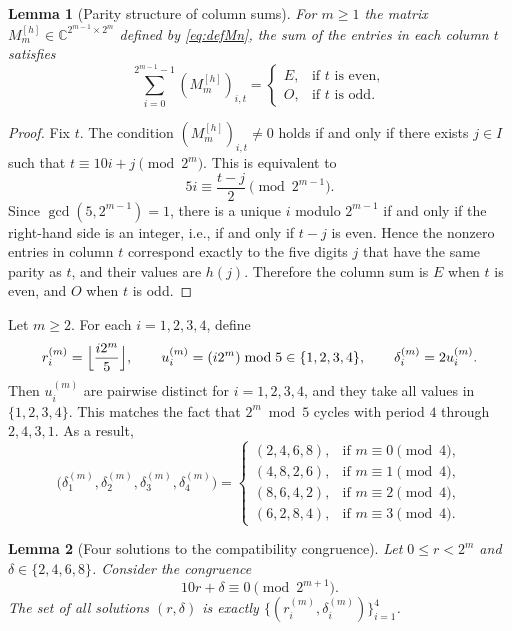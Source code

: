 \documentclass[11pt,a4paper]{article}
\newtheorem{lemma}{Lemma}
\theoremstyle{plain}
\begin{document}
\begin{lemma}[Parity structure of column sums]\label{lem:colsum}
For $m\ge 1$ the matrix $M_m^{[h]}\in\mathbb{C}^{2^{m-1}\times 2^{m}}$ defined by \eqref{eq:defMn}, the sum of the entries in each column $t$ satisfies
\[
\sum_{i=0}^{2^{m-1}-1} (M_m^{[h]})_{i,t} =
\begin{cases}
E, & \text{if } t \text{ is even},\\[1ex]
O, & \text{if } t \text{ is odd}.
\end{cases}
\]
\end{lemma}

\begin{proof}
Fix $t$.
The condition $(M_m^{[h]})_{i,t}\neq 0$ holds if and only if there exists $j \in I$ such that $t \equiv 10i+j \pmod{2^m}$.
This is equivalent to
\[
5i \equiv \frac{t-j}{2} \pmod{2^{m-1}}.
\]
Since $\gcd(5,2^{m-1})=1$, there is a unique $i$ modulo $2^{m-1}$ if and only if the right-hand side is an integer, i.e., if and only if $t-j$ is even.
Hence the nonzero entries in column $t$ correspond exactly to the five digits $j$ that have the same parity as $t$, and their values are $h(j)$.
Therefore the column sum is $E$ when $t$ is even, and $O$ when $t$ is odd.
\end{proof}

\medskip
Let $m\ge 2$.
For each $i=1,2,3,4$, define
\begin{equation}\label{def_notation}
r_i^{(m)} = \Bigl\lfloor \frac{i 2^{m}}{5}\Bigr\rfloor,\qquad
u_i^{(m)} = (i 2^{m}) \bmod 5 \in \{1,2,3,4\},\qquad
\delta_i^{(m)} = 2 u_i^{(m)}.
\end{equation}
Then $u_i^{(m)}$ are pairwise distinct for $i=1,2,3,4$, and they take all values in $\{1,2,3,4\}$.
This matches the fact that $2^{m}\bmod 5$ cycles with period $4$ through $2,4,3,1$.
As a result,
\[
\bigl(\delta_1^{(m)},\delta_2^{(m)},\delta_3^{(m)},\delta_4^{(m)}\bigr)=
\begin{cases}
(2,4,6,8), & \text{if } m\equiv 0\pmod{4},\\
(4,8,2,6), & \text{if } m\equiv 1\pmod{4},\\
(8,6,4,2), & \text{if } m\equiv 2\pmod{4},\\
(6,2,8,4), & \text{if } m\equiv 3\pmod{4}.
\end{cases}
\]

\begin{lemma}[Four solutions to the compatibility congruence]\label{lem:B}
Let $0 \le r < 2^{m}$ and $\delta\in\{2,4,6,8\}$.
Consider the congruence
\[
10r+\delta\equiv 0 \pmod{2^{m+1}}.
\]
The set of all solutions $(r,\delta)$ is exactly $\{(r_i^{(m)},\delta_i^{(m)})\}_{i=1}^4$.
\end{lemma}
\end{document}
